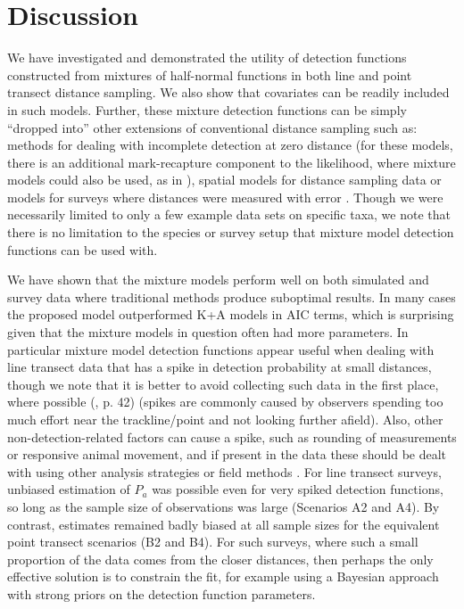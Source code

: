 \documentclass[10pt]{article}
\begin{document}
\section*{Discussion}

We have investigated and demonstrated the utility of detection functions constructed from mixtures of half-normal functions in both line and point transect distance sampling. We also show that covariates can be readily included in such models. Further, these mixture detection functions can be simply ``dropped into'' other extensions of conventional distance sampling such as: methods for dealing with incomplete detection at zero distance \cite{Laake:2004tz, Laake:2011vm} (for these models, there is an additional mark-recapture component to the likelihood, where mixture models could also be used, as in \cite{Pledger:2000tc, Dorazio:2003uf, Pledger:2005wy, Morgan:2008wy}), spatial models for distance sampling data \cite{Hedley:2004et, Miller:2013us} or models for surveys where distances were measured with error \cite{Borchers:2010bq}.  Though we were necessarily limited to only a few example data sets on specific taxa, we note that there is no limitation to the species or survey setup that mixture model detection functions can be used with.

We have shown that the mixture models perform well on both simulated and survey data where traditional methods produce suboptimal results. In many cases the proposed model outperformed K+A models in AIC terms, which is surprising given that the mixture models in question often had more parameters. In particular mixture model detection functions appear useful when dealing with line transect data that has a spike in detection probability at small distances, though we note that it is better to avoid collecting such data in the first place, where possible (\cite{Buckland:2001vm}, p. 42) (spikes are commonly caused by observers spending too much effort near the trackline/point and not looking further afield).  Also, other non-detection-related factors can cause a spike, such as rounding of measurements or responsive animal movement, and if present in the data these should be dealt with using other analysis strategies or field methods \cite{Buckland:2001vm}.  For line transect surveys, unbiased estimation of $P_a$ was possible even for very spiked detection functions, so long as the sample size of observations was large (Scenarios A2 and A4).  By contrast, estimates remained badly biased at all sample sizes for the equivalent point transect scenarios (B2 and B4). For such surveys, where such a small proportion of the data comes from the closer distances, then perhaps the only effective solution is to constrain the fit, for example using a Bayesian approach with strong priors on the detection function parameters.
\end{document}
